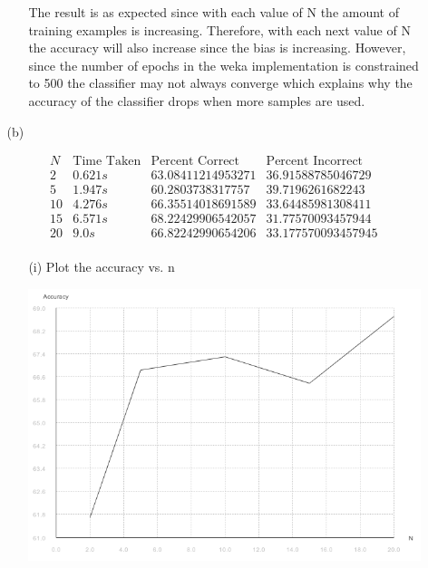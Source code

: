\begin{enumerate}
\begin{enumerate}
\begin{enumerate}
						The result is as expected since with each value of N the amount of training examples is increasing. Therefore, with each next value of N the accuracy will also increase since the bias is increasing.  However, since the number of epochs in the weka implementation is constrained to 500 the classifier may not always converge which explains why the accuracy of the classifier drops when more samples are used.
						
				\end{enumerate}
			
			\item[(b)] 
				
					\[
						\begin{array}{c|ccc}
							N & \text{Time Taken} & \text{Percent Correct} & \text{Percent Incorrect} \\
							\hline
							2 & 0.621s & 63.08411214953271 & 36.91588785046729 \\
							5 & 1.947s & 60.2803738317757 & 39.7196261682243 \\
							10 & 4.276s & 66.35514018691589 & 33.64485981308411 \\
							15 & 6.571s & 68.22429906542057 & 31.77570093457944 \\
							20 & 9.0s & 66.82242990654206 & 33.177570093457945 \\
						\end{array}
					\]
					
				\begin{enumerate}
				
					\item[(i)] Plot the accuracy vs. n
					
						\includegraphics[scale=0.5]{p1b-i-graph}
					

\end{enumerate}
\end{enumerate}
\end{enumerate}
